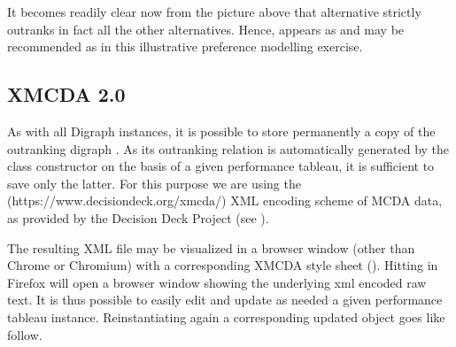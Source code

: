 \documentclass[a4paper,12pt,english]{sphinxhowto}
\begin{document}
It becomes readily clear now from the picture above that alternative  strictly outranks in fact all the other alternatives. Hence,  appears as  and may be recommended as  in this illustrative preference modelling exercise.


\subsection{XMCDA 2.0}
\label{\detokenize{tutorial:xmcda-2-0}}
As with all Digraph instances, it is possible to store permanently a copy of the outranking digraph . As its outranking relation is automatically generated by the  class constructor on the basis of a given performance tableau, it is sufficient to save only the latter. For this purpose we are using the  (https://www.decision\sphinxhyphen{}deck.org/xmcda/) XML encoding scheme of MCDA data, as provided by the Decision Deck Project (see ).

\begin{sphinxVerbatim}[commandchars=\\\{\},numbers=left,firstnumber=1,stepnumber=1]
\end{sphinxVerbatim}

The resulting XML file may be visualized in a browser window (other than Chrome or Chromium)  with a corresponding XMCDA style sheet (). Hitting  in Firefox will open a browser window showing the underlying xml encoded raw text. It is thus possible to easily edit and update as needed a given performance tableau instance. Re\sphinxhyphen{}instantiating again a corresponding updated  object goes like follow.
\end{document}

